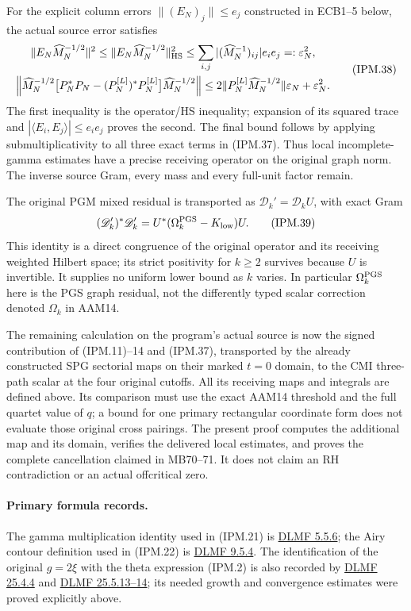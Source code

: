 \documentclass[11pt,a4paper]{article}
\theoremstyle{definition}
\begin{document}
For the explicit column errors \(\|(E_N)_j\|\le e_j\) constructed in ECB1--5 below,
the actual source error satisfies
\[
 \begin{gathered}
 \|E_N\widehat M_N^{-1/2}\|^2
 \le\|E_N\widehat M_N^{-1/2}\|_{\rm HS}^2
 \le\sum_{i,j}|(\widehat M_N^{-1})_{ij}|e_ie_j=:\varepsilon_N^2,\\
 \left\|\widehat M_N^{-1/2}
   \bigl[P_N^*P_N-(P_N^{[L]})^*P_N^{[L]}\bigr]
                        \widehat M_N^{-1/2}\right\|
 \le2\|P_N^{[L]}\widehat M_N^{-1/2}\|\varepsilon_N+\varepsilon_N^2.
 \end{gathered}
 \tag{IPM.38}
\]
The first inequality is the operator/HS inequality; expansion of its
squared trace and \(|\langle E_i,E_j\rangle|\le e_ie_j\) proves
the second. The final bound follows by applying submultiplicativity to
all three exact terms in (IPM.37). Thus local incomplete-gamma estimates
have a precise receiving operator on the original graph norm. The
inverse source Gram, every mass and every full-unit factor remain.

The original PGM mixed residual is transported as
\(\mathscr D_k'=\mathscr D_kU\), with exact Gram
\[
 (\mathscr D_k')^*\mathscr D_k'
      =U^*(\Omega_k^{\rm PGS}-K_{\rm low})U.
 \tag{IPM.39}
\]
This identity is a direct congruence of the original operator and its
receiving weighted Hilbert space; its strict positivity for \(k\ge2\)
survives because \(U\) is invertible. It supplies no uniform lower
bound as \(k\) varies. In particular \(\Omega_k^{\rm PGS}\) here is
the PGS graph residual, not the differently typed scalar correction
denoted \(\Omega_k\) in AAM14.

The remaining calculation on the program's actual source is now the
signed contribution of (IPM.11)--14 and (IPM.37), transported by the
already constructed SPG sectorial maps on their marked \(t=0\)
domain, to the CMI three-path scalar
at the four original cutoffs. All its receiving maps and integrals are
defined above. Its comparison must use the exact AAM14 threshold and
the full quartet value of \(q\); a bound for one primary rectangular
coordinate form does not evaluate those original cross pairings.
The present proof computes the additional map and its domain, verifies
the delivered local estimates, and proves the complete cancellation
claimed in MB70--71. It does not claim an RH contradiction or an
actual offcritical zero.

\paragraph{Primary formula records.}
The gamma multiplication identity used in (IPM.21) is
\href{https://dlmf.nist.gov/5.5.E6}{DLMF 5.5.6}; the Airy contour
definition used in (IPM.22) is
\href{https://dlmf.nist.gov/9.5.E4}{DLMF 9.5.4}. The identification of
the original \(g=2\xi\) with the theta expression (IPM.2) is also
recorded by \href{https://dlmf.nist.gov/25.4.E4}{DLMF 25.4.4} and
\href{https://dlmf.nist.gov/25.5.E13}{DLMF 25.5.13--14}; its needed
growth and convergence estimates were proved explicitly above.
\end{document}
